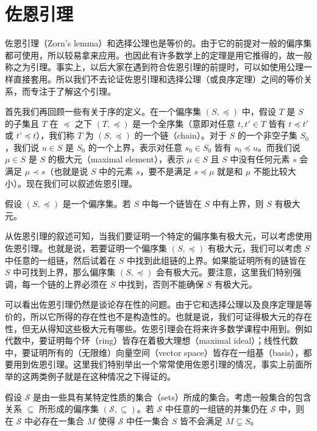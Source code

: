 \section{佐恩引理}

佐恩引理（Zorn's lemma）和选择公理也是等价的。由于它的前提对一般的偏序集都可使用，所以较易拿来应用。也因此有许多数学上的定理是用它推得的，故一般称之为引理。事实上，以后大家在遇到符合佐恩引理的前提时，可以如使用公理一样直接套用。所以我们不去论证佐恩引理和选择公理（或良序定理）之间的等价关系，而专注于了解这个引理。

首先我们再回顾一些有关于序的定义。在一个偏序集 $(S, \preceq)$ 中，假设 $T$ 是 $S$ 的子集且 $T$ 在 $\preceq$ 之下 $(T, \preceq)$ 是一个全序集（意即对任意 $t, t' \in T$ 皆有 $t \preceq t'$ 或 $t' \preceq t$），我们称 $T$ 为 $(S, \preceq)$ 的一个链（chain）。对于 $S$ 的一个非空子集 $S_0$，我们说 $u \in S$ 是 $S_0$ 的一个上界，表示对任意 $s_0 \in S_0$ 皆有 $s_0 \preceq u$。而我们说 $\mu \in S$ 是 $S$ 的极大元（maximal element），表示 $\mu \in S$ 且 $S$ 中没有任何元素 $s$ 会满足 $\mu \prec s$（也就是说 $S$ 中的元素 $s$，要不是满足 $s \preceq \mu$ 就是和 $\mu$ 不能比较大小）。现在我们可以叙述佐恩引理。

\begin{lemma}[佐恩引理]
假设 $(S, \preceq)$ 是一个偏序集。若 $S$ 中每一个链皆在 $S$ 中有上界，则 $S$ 有极大元。
\end{lemma}

从佐恩引理的叙述可知，当我们要证明一个特定的偏序集有极大元，可以考虑使用佐恩引理。也就是说，若要证明一个偏序集 $(S, \preceq)$ 有极大元，我们可以考虑 $S$ 中任意的一组链，然后试着在 $S$ 中找到此组链的上界。如果能证明所有的链皆在 $S$ 中可找到上界，那么偏序集 $(S, \preceq)$ 会有极大元。要注意，这里我们特别强调，每一个链的上界必须在 $S$ 中找到，否则不能确保 $S$ 有极大元。

可以看出佐恩引理仍然是谈论存在性的问题。由于它和选择公理以及良序定理是等价的，所以它所得的存在性也不是构造性的。也就是说，我们可证得极大元的存在性，但无从得知这些极大元有哪些。佐恩引理会在将来许多数学课程中用到。例如代数中，要证明每个环（ring）皆存在着极大理想（maximal ideal）；线性代数中，要证明所有的（无限维）向量空间（vector space）皆存在一组基（basis），都要用到佐恩引理。这里我们特别举出一个常常使用佐恩引理的情况，事实上前面所举的这两类例子就是在这种情况之下得证的。

\begin{proposition}
假设 $\mathcal{S}$ 是由一些具有某特定性质的集合（sets）所成的集合。考虑一般集合的包含关系 $\subseteq$ 所形成的偏序集 $(\mathcal{S}, \subseteq)$。若 $\mathcal{S}$ 中任意的一组链的并集仍在 $\mathcal{S}$ 中，则在 $\mathcal{S}$ 中必存在一集合 $M$ 使得 $\mathcal{S}$ 中任一集合 $S$ 皆不会满足 $M \subsetneq S$。
\end{proposition}

